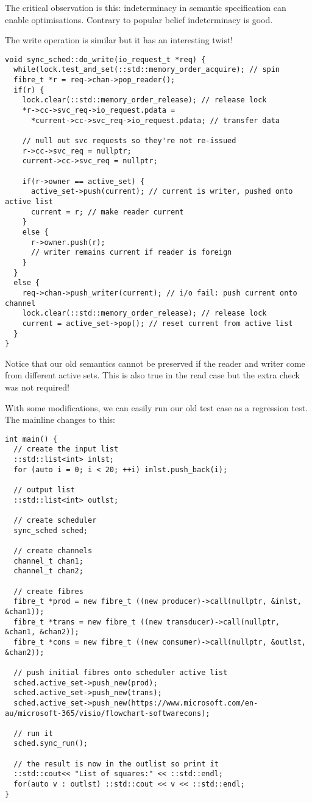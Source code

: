 \documentclass[oneside]{book}
\begin{document}
The critical observation is this: indeterminacy in semantic
specification can enable optimisations. Contrary to popular
belief indeterminacy is good.

The write operation is similar but it has an interesting twist!

\begin{verbatim}
void sync_sched::do_write(io_request_t *req) {
  while(lock.test_and_set(::std::memory_order_acquire); // spin
  fibre_t *r = req->chan->pop_reader();
  if(r) {
    lock.clear(::std::memory_order_release); // release lock
    *r->cc->svc_req->io_request.pdata = 
      *current->cc->svc_req->io_request.pdata; // transfer data

    // null out svc requests so they're not re-issued
    r->cc->svc_req = nullptr;
    current->cc->svc_req = nullptr;

    if(r->owner == active_set) {
      active_set->push(current); // current is writer, pushed onto active list
      current = r; // make reader current
    }
    else {
      r->owner.push(r);
      // writer remains current if reader is foreign
    }
  }
  else {
    req->chan->push_writer(current); // i/o fail: push current onto channel
    lock.clear(::std::memory_order_release); // release lock
    current = active_set->pop(); // reset current from active list
  }
}

\end{verbatim}

Notice that our old semantics cannot be preserved if the reader and
writer come from different active sets. This is also true in the read
case but the extra check was not required!

With some modifications, we can easily run our old test case as a regression test.
The mainline changes to this:

\begin{verbatim}
int main() {
  // create the input list
  ::std::list<int> inlst;
  for (auto i = 0; i < 20; ++i) inlst.push_back(i);

  // output list
  ::std::list<int> outlst;

  // create scheduler
  sync_sched sched;

  // create channels
  channel_t chan1;
  channel_t chan2;

  // create fibres
  fibre_t *prod = new fibre_t ((new producer)->call(nullptr, &inlst, &chan1));
  fibre_t *trans = new fibre_t ((new transducer)->call(nullptr, &chan1, &chan2));
  fibre_t *cons = new fibre_t ((new consumer)->call(nullptr, &outlst, &chan2));

  // push initial fibres onto scheduler active list
  sched.active_set->push_new(prod);
  sched.active_set->push_new(trans);
  sched.active_set->push_new(https://www.microsoft.com/en-au/microsoft-365/visio/flowchart-softwarecons);
 
  // run it
  sched.sync_run();

  // the result is now in the outlist so print it
  ::std::cout<< "List of squares:" << ::std::endl;
  for(auto v : outlst) ::std::cout << v << ::std::endl;
} 
\end{verbatim}
\end{document}
